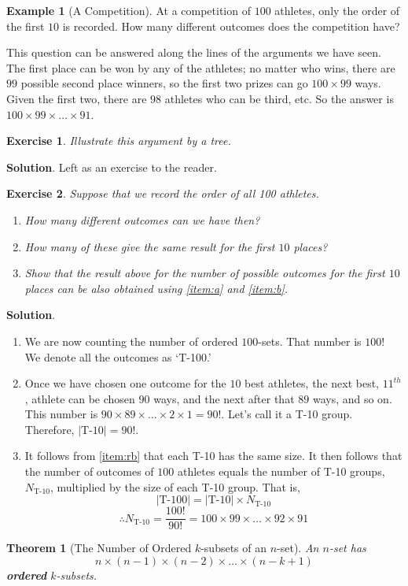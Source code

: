 \documentclass[11pt]{book}
\theoremstyle{definition}
\theoremstyle{plain}
\newtheorem{theorem}{Theorem}
\newtheorem{exercise}{Exercise}
\theoremstyle{definition}
\newtheorem{example}{Example}
\theoremstyle{problemstyle}
\theoremstyle{remark}
\theoremstyle{definition}
\begin{document}
\begin{example}[A Competition]
At a competition of $100$ athletes, only the order of the first $10$ is recorded.  How many different outcomes does the competition have?

This question can be answered along the lines of the arguments we have seen. The first place can be won by any of the athletes; no matter who wins, there are $99$ possible second place winners, so the first two prizes can go $100\times99$ ways. Given the first two, there are $98$ athletes who can be third, etc. So the answer is $100\times99\times\dots\times91$.
\end{example}
\begin{exercise}
    \label{ex:1.7.1}
    Illustrate this argument by a tree.
\end{exercise}
\textbf{Solution}.
Left as an exercise to the reader.
\begin{exercise}
    Suppose that we record the order of all 100 athletes.
    \begin{enumerate}[label={(\alph*})]
        \item \label{item:a}How many different outcomes can we have then?
        \item \label{item:b}How many of these give the same result for the first $10$ places?
        \item Show that the result above for the number of possible outcomes for the first $10$ places can be also obtained using \ref{item:a} and \ref{item:b}.
    \end{enumerate}
    \label{ex:1.7.2}
\end{exercise}
\textbf{Solution}.
    \begin{enumerate}[label={(\alph*})]
        \item \label{item:ra}We are now counting the number of ordered $100$-sets. That number is $100!$ We denote all the outcomes as `T-100.'
        \item \label{item:rb}Once we have chosen one outcome for the $10$ best athletes, the next best, $11^{th}$, athlete can be chosen $90$ ways, and the next after that $89$ ways, and so on. This number is $90\times89\times\dots\times2\times1=90!$. Let's call it a T-10 group. Therefore, $\lvert\text{T-10}\rvert=90!$.
        \item It follows from \ref{item:rb} that each T-10 has the same size. It then follows that the number of outcomes of $100$ athletes equals the number of T-10 groups, $N_{\text{T-10}}$, multiplied by the size of each T-10 group. That is,
            \[
                \lvert\text{T-100}\rvert=\lvert\text{T-10}\rvert\times N_{\text{T-10}}
            \]
            \[
                \therefore N_{\text{T-10}}=\frac{100!}{90!}=100\times99\times\dots\times92\times91
            \]

    \end{enumerate}
\begin{theorem}[The Number of Ordered $k$-subsets of an $n$-set]
    An $n$-set has
    \[
        n\times(n-1)\times(n-2)\times\dots\times(n-k+1)
    \]
    \textbf{ordered} $k$-subsets.
    \label{th:ordered-k-subsets}
\end{theorem}
\end{document}
